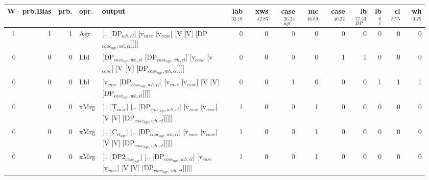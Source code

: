 \begin{tabularx}{\linewidth}{rrrlXrrrrrrrrr}
\hline
   W &   prb.Bias &   prb. & opr.   & output                                                                                                                    &   lab$^{32.18}$ &   xws$^{42.85}$ &   case$_{agr}^{26.24}$ &   mc$^{46.89}$ &   case$^{46.22}$ &   lb$_{DP}^{77.43}$ &   lb$_{v}^{0}$ &   cl$^{3.75}$ &   wh$^{3.75}$ \\
\hline
   1 &       1 &   1 & Agr  & [.. [DP$_{wh,cl}$] [v$_{case}$ [v$_{case}$] [V [V] [DP$_{case_{agr},wh,cl}$]]]]                                                             &             0 &             0 &                  0 &            0 &              0 &               0 &             0 &        0 &        0 \\
   0 &       0 &   0 & Lbl  & [DP$_{case_{agr},wh,cl}$ [DP$_{case_{agr},wh,cl}$] [v$_{case}$ [v$_{case}$] [V [V] [DP$_{case_{agr},wh,cl}$]]]]                                     &             0 &             0 &                  0 &            0 &              1 &               1 &             0 &        0 &        0 \\
   0 &       0 &   0 & Lbl  & [v$_{case}$ [DP$_{case_{agr},wh,cl}$] [v$_{case}$ [v$_{case}$] [V [V] [DP$_{case_{agr},wh,cl}$]]]]                                                &             0 &             0 &                  1 &            0 &              0 &               0 &             1 &        1 &        1 \\
   0 &       0 &   0 & xMrg & [.. [T$_{case}$] [.. [DP$_{case_{agr},wh,cl}$] [v$_{case}$ [v$_{case}$] [V [V] [DP$_{case_{agr},wh,cl}$]]]]]                                      &             1 &             0 &                  0 &            1 &              0 &               0 &             0 &        0 &        0 \\
   0 &       0 &   0 & xMrg & [.. [C$_{cl_{agr}}$] [.. [DP$_{case_{agr},wh,cl}$] [v$_{case}$ [v$_{case}$] [V [V] [DP$_{case_{agr},wh,cl}$]]]]]                                    &             1 &             0 &                  0 &            1 &              0 &               0 &             0 &        0 &        0 \\
   0 &       0 &   0 & xMrg & [.. [DP2$_{case_{agr}}$] [.. [DP$_{case_{agr},wh,cl}$] [v$_{case}$ [v$_{case}$] [V [V] [DP$_{case_{agr},wh,cl}$]]]]]                                &             1 &             0 &                  0 &            1 &              0 &               0 &             0 &        0 &        0 \\

\end{tabularx}
